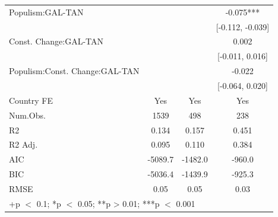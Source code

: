 \documentclass[
  abstract]{article}
\begin{document}
\begin{table}
\begin{tabular}[t]{lccc}
Populism:GAL-TAN &  &  & -0.075***\\
 &  &  & {}[-0.112, -0.039]\\
Const. Change:GAL-TAN &  &  & 0.002\\
 &  &  & {}[-0.011, 0.016]\\
Populism:Const. Change:GAL-TAN &  &  & -0.022\\
 &  &  & {}[-0.064, 0.020]\\
\midrule
Country FE & Yes & Yes & Yes\\
Num.Obs. & 1539 & 498 & 238\\
R2 & 0.134 & 0.157 & 0.451\\
R2 Adj. & 0.095 & 0.110 & 0.384\\
AIC & -5089.7 & -1482.0 & -960.0\\
BIC & -5036.4 & -1439.9 & -925.3\\
RMSE & 0.05 & 0.05 & 0.03\\
\bottomrule
\multicolumn{4}{l}{\rule{0pt}{1em}+p $<$ 0.1; *p $<$ 0.05; **p > 0.01; ***p $<$ 0.001}\\
\end{tabular}
\end{table}
\end{document}
